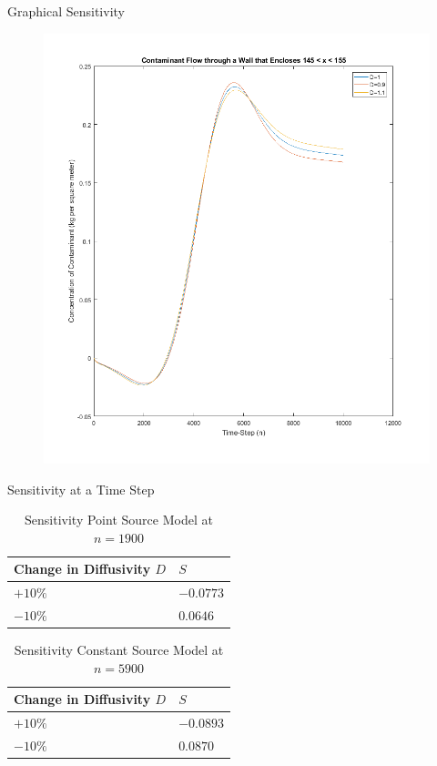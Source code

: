 \documentclass[10pt]{beamer}
\begin{document}
\begin{frame}{Graphical Sensitivity}
\begin{figure}
\begin{minipage}[b]{0.496\textwidth}
   \includegraphics[trim=0mm 0mm 0mm 0mm,clip,width=1.1\linewidth]{senseconst.png}
\begin{center}
\end{center}
\end{minipage}
\end{figure}
\hyperlink{Questions}{}
\end{frame}

\begin{frame}{Sensitivity at a Time Step}\label{Sensitivity at time step}

\begin{table}
\caption{Sensitivity Point Source Model at $n=1900$}
\begin{tabular}{|l|l|}
\hline
Change in Diffusivity $D$          & $S$ \\ \hline
$+10\%$    & $-0.0773$              \\ \hline
$-10\%$   & $0.0646$              \\ \hline
\end{tabular}
\end{table}

\begin{table}
\centering
\caption{Sensitivity Constant Source Model at $n=5900$}
\begin{tabular}{|l|l|}
\hline
Change in Diffusivity $D$           & $S$ \\ \hline
$+10\%$    & $-0.0893$              \\ \hline
$-10\%$   & $0.0870$              \\ \hline
\end{tabular}
\end{table}
\hyperlink{Questions}{}
\end{frame}
\end{document}
